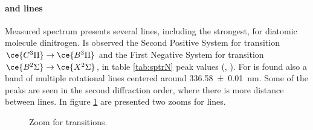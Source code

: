 \paragraph{ and  lines}
Measured spectrum presents several lines, including the strongest, for diatomic molecule dinitrogen. Is observed the Second Positive System for  transition $\ce{C^3\Pi} \rightarrow \ce{B^3\Pi}$ and the First Negative System for  transition $\ce{B^2\Sigma} \rightarrow \ce{X^2\Sigma}$, in table \ref{tab:sptrN} peak values (\cite{N2lab}, \cite{Britun_2007}). For  is found also a band of multiple rotational lines centered around \SI{336.58(1)}{\nano\meter}.
Some of the peaks are seen in the second diffraction order, where there is more distance between lines. In figure \ref{fig:N2} are presented two zooms for  lines.
\begin{figure}
 \centering
 \hfill
 \caption{Zoom for  transitions.}
 \label{fig:N2}
\end{figure}

